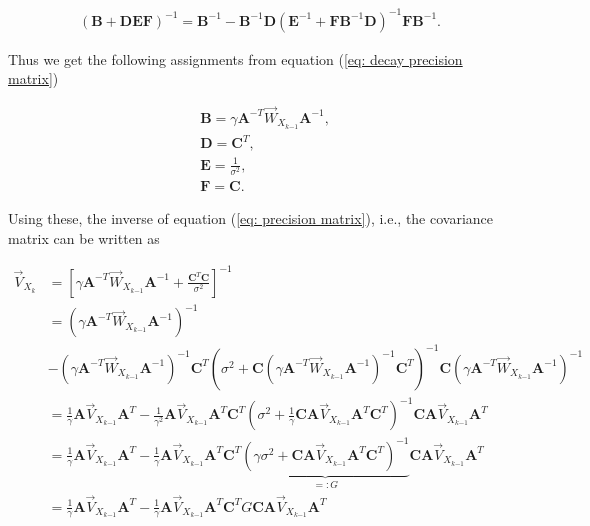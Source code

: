 \documentclass[11pt,a4paper,twoside]{report}
\newcommand{\messF}[3]{\overrightarrow{#1}_{{#2}_{k{#3}}}}
\newcommand{\mat}[1]{\mathbf{#1}}
\begin{document}
\begin{align}
	\label{eq: matrix inversion lemma}
	\left(\mat{B} + \mat{DEF}\right)^{-1} = \mat{B}^{-1} - \mat{B}^{-1}\mat{D}\left(\mat{E}^{-1} + \mat{F}\mat{B}^{-1}\mat{D}\right)^{-1}\mat{F}\mat{B}^{-1}.
\end{align}

\noindent Thus we get the following assignments from equation (\ref{eq: decay precision matrix})

\begin{align}
	\label{eq: assignments MIL}
	& \mat{B} = \gamma \mat{A}^{-T}\messF{W}{X}{-1}\mat{A}^{-1}, \\
	& \mat{D} = \mat{C}^T, \\
	& \mat{E} = \frac{1}{\sigma^2}, \\
	& \mat{F} = \mat{C}.
\end{align}

Using these, the inverse of equation (\ref{eq: precision matrix}), i.e., the covariance matrix can be written as

\begin{align}
	\label{eq: update rule, covariance}
	\messF{V}{X}{} &= \left[\gamma \mat{A}^{-T}\messF{W}{X}{-1}\mat{A}^{-1} + \frac{\mat{C}^T\mat{C}}{\sigma^2}\right]^{-1} \\
	\nonumber
	&= \left(\gamma \mat{A}^{-T}\messF{W}{X}{-1}\mat{A}^{-1}\right)^{-1} \\
	& - \left(\gamma \mat{A}^{-T}\messF{W}{X}{-1}\mat{A}^{-1}\right)^{-1}\mat{C}^T\left(\sigma^2 + \mat{C}\left(\gamma \mat{A}^{-T}\messF{W}{X}{-1}\mat{A}^{-1}\right)^{-1}\mat{C}^T\right)^{-1}\mat{C}\left(\gamma \mat{A}^{-T}\messF{W}{X}{-1}\mat{A}^{-1}\right)^{-1} \\
	\nonumber
	&= \frac{1}{\gamma} \mat{A}\messF{V}{X}{-1}\mat{A}^T - \frac{1}{\gamma^2} \mat{A}\messF{V}{X}{-1}\mat{A}^T\mat{C}^T\left(\sigma^2 + \frac{1}{\gamma}  \mat{C}\mat{A}\messF{V}{X}{-1}\mat{A}^T\mat{C}^T\right)^{-1}\mat{C}\mat{A}\messF{V}{X}{-1}\mat{A}^T \\
	&= \frac{1}{\gamma} \mat{A}\messF{V}{X}{-1}\mat{A}^T - \frac{1}{\gamma} \mat{A}\messF{V}{X}{-1}\mat{A}^T\mat{C}^T\underbrace{\left(\gamma \sigma^2 + \mat{C}\mat{A}\messF{V}{X}{-1}\mat{A}^T\mat{C}^T\right)^{-1}}_{=:G}\mat{C}\mat{A}\messF{V}{X}{-1}\mat{A}^T \\
	&= \frac{1}{\gamma}  \mat{A}\messF{V}{X}{-1}\mat{A}^T - \frac{1}{\gamma}  \mat{A}\messF{V}{X}{-1}\mat{A}^T\mat{C}^TG\mat{CA}\messF{V}{X}{-1}\mat{A}^T
\end{align}
\end{document}
